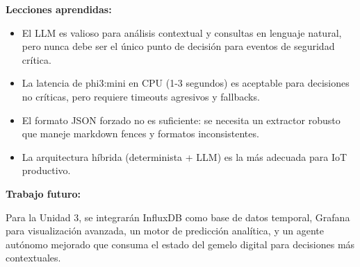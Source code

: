 \documentclass[12pt,letterpaper]{article}
\begin{document}
\textbf{Lecciones aprendidas:}

\begin{itemize}
    \item El LLM es valioso para análisis contextual y consultas en lenguaje natural, pero nunca debe ser el único punto de decisión para eventos de seguridad crítica.
    \item La latencia de phi3:mini en CPU (1-3 segundos) es aceptable para decisiones no críticas, pero requiere timeouts agresivos y fallbacks.
    \item El formato JSON forzado no es suficiente: se necesita un extractor robusto que maneje markdown fences y formatos inconsistentes.
    \item La arquitectura híbrida (determinista + LLM) es la más adecuada para IoT productivo.
\end{itemize}

\textbf{Trabajo futuro:}

Para la Unidad 3, se integrarán InfluxDB como base de datos temporal, Grafana para visualización avanzada, un motor de predicción analítica, y un agente autónomo mejorado que consuma el estado del gemelo digital para decisiones más contextuales.
\end{document}
